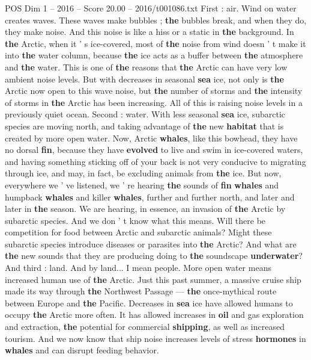 \begin{textsample}{POS Dim 1 – 2016 – Score 20.00 – 2016/t001086.txt}
First : air.
Wind on water creates waves.
These waves make bubbles ; \textbf{the} bubbles break, and when they do, they make noise.
And this noise is like a hiss or a static in \textbf{the} background.
In \textbf{the} Arctic, when it ' s ice-covered, most of \textbf{the} noise from wind doesn ' t make it into \textbf{the} water column, because \textbf{the} ice acts as a buffer between \textbf{the} atmosphere and \textbf{the} water.
This is one of \textbf{the} reasons that \textbf{the} Arctic can have very low ambient noise levels.
But with decreases in seasonal \textbf{sea} ice, not only is \textbf{the} Arctic now open to this wave noise, but \textbf{the} number of storms and \textbf{the} intensity of storms in \textbf{the} Arctic has been increasing.
All of this is raising noise levels in a previously quiet ocean.
Second : water.
With less seasonal \textbf{sea} ice, subarctic species are moving north, and taking advantage of \textbf{the} new \textbf{habitat} that is created by more open water.
Now, Arctic \textbf{whales}, like this bowhead, they have no dorsal \textbf{fin}, because they have \textbf{evolved} to live and swim in ice-covered waters, and having something sticking off of your back is not very conducive to migrating through ice, and may, in fact, be excluding animals from \textbf{the} ice.
But now, everywhere we ' ve listened, we ' re hearing \textbf{the} sounds of \textbf{fin} \textbf{whales} and humpback \textbf{whales} and killer \textbf{whales}, further and further north, and later and later in \textbf{the} season.
We are hearing, in essence, an invasion of \textbf{the} Arctic by subarctic species.
And we don ' t know what this means.
Will there be competition for food between Arctic and subarctic animals?
Might these subarctic species introduce diseases or parasites into \textbf{the} Arctic?
And what are \textbf{the} new sounds that they are producing doing to \textbf{the} soundscape \textbf{underwater}?
And third : land.
And by land...
I mean people.
More open water means increased human use of \textbf{the} Arctic.
Just this past summer, a massive cruise ship made its way through \textbf{the} Northwest Passage — \textbf{the} once-mythical route between Europe and \textbf{the} Pacific.
Decreases in \textbf{sea} ice have allowed humans to occupy \textbf{the} Arctic more often.
It has allowed increases in \textbf{oil} and gas exploration and extraction, \textbf{the} potential for commercial \textbf{shipping}, as well as increased tourism.
And we now know that ship noise increases levels of stress \textbf{hormones} in \textbf{whales} and can disrupt feeding behavior.

\end{textsample}
